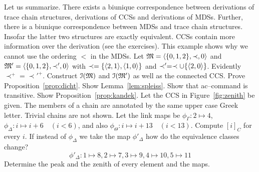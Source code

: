 Let us summarize. There exists a biunique correspondence
between derivations of trace chain structures, derivations of
CCSs and derivations of MDSs.  Further, there is a biunique
correspondence between MDSs and trace chain structures.
Insofar the latter two structures are exactly equivalent.
CCSs contain more information over the derivation (see the
exercises).
\vplatz
\exercise
This example shows why we cannot use the ordering
$<$ in the MDSs. Let $\mathfrak{M} = \langle \{0,1,2\}, \prec, 0\rangle$ and
$\mathfrak{M}' = \langle \{0,1,2\}, \prec', 0\rangle$ with
$\prec = \{\langle 2,1\rangle, \langle 1,0\rangle\}$ and
$\prec' = \prec \cup \{\langle 2,0\rangle\}$.
Evidently $\prec^+ = \prec'^+$.  Construct $\mathcal{I}(\mathfrak{M})$ and
$\mathcal{I}(\mathfrak{M}')$ as well as the connected CCS.
\vplatz
\exercise
Prove Proposition~\ref{prop:dicht}.
\vplatz
\exercise
Show Lemma~\ref{lem:spleiss}.
\vplatz
\exercise
Show that ac--command is transitive.
\vplatz
\exercise
Show Proposition~\ref{prop:kandek}.
\vplatz
\exercise
Let the CCS in Figure~\ref{fig:zenith} be given. The members of
a chain are annotated by the same upper case Greek letter.
Trivial chains are not shown. Let the link maps be
$\phi_{\Gamma} \colon 2 \mapsto 4$, $\phi_{\Delta} \colon i \mapsto i + 6
\quad (i < 6)$, and also $\phi_{\Theta} \colon i \mapsto i + 13 
\quad (i < 13)$. Compute $[i]_{C}$ for every $i$. If instead of 
$\phi_{\Delta}$ we take the map $\phi'_{\Delta}$  how do the 
equivalence classes change?
\begin{equation}
\phi'_{\Delta} \colon 1 \mapsto 8, 2 \mapsto 7, 3 \mapsto 9, 4
\mapsto 10, 5 \mapsto 11
\end{equation}
Determine the peak and the zenith of every element and the
maps.
